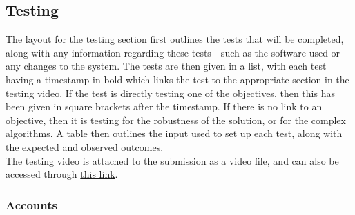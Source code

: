 \documentclass{article}
\begin{document}
\subsection{Testing}

The layout for the testing section first outlines the tests that will be completed, along with any information regarding these tests---such as the software used or any changes to the system. The tests are then given in a list, with each test having a timestamp in bold which links the test to the appropriate section in the testing video. If the test is directly testing one of the objectives, then this has been given in square brackets after the timestamp. If there is no link to an objective, then it is testing for the robustness of the solution, or for the complex algorithms. A table then outlines the input used to set up each test, along with the expected and observed outcomes. \\

The testing video is attached to the submission as a video file, and can also be accessed through \href{https://1drv.ms/f/c/3e1f08d3e4fd818b/IgCUS8aHwVSwRLBoNFkl4_LRAT6VirQSBWDmTAvQZIteqOY?e=ovwiRN}{this link}.

\subsubsection{Accounts}
\end{document}
